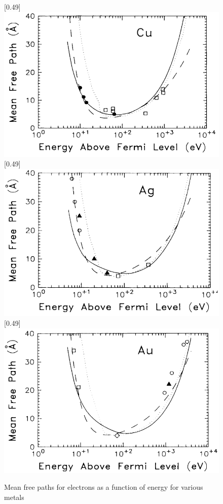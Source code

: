 \begin{figure}[h!]
\centering
{}[0.49\linewidth]{\includegraphics[scale=0.35]{Figs/IMFP Cu.png}}
[0.49\linewidth]{\includegraphics[scale=0.35]{Figs/IMFP Ag.png}}\\
[0.49\linewidth]{\includegraphics[scale=0.35]{Figs/IMFP Au.png}}
\caption{Mean free paths for electrons as a function of energy for various metals\cite{penn1987electron}}
\label{fig:IMFP}
\end{figure}

